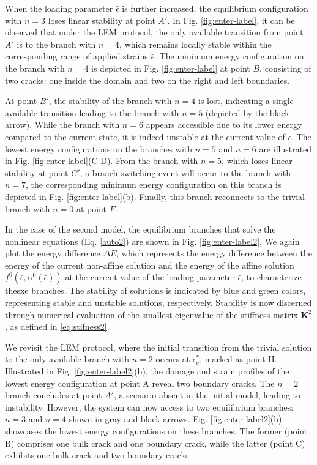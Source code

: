 When the loading parameter $\bar{\epsilon}$ is further increased, the equilibrium configuration with $n=3$ loses linear stability at point $A'$. In Fig. \ref{fig:enter-label}, it can be observed that under the LEM protocol, the only available transition from point $A'$ is to the branch with $n=4$, which remains locally stable within the corresponding range of applied strains $\bar{\epsilon}$. The minimum energy configuration on the branch with $n=4$ is depicted in Fig. \ref{fig:enter-label} at point $B$, consisting of two cracks: one inside the domain and two on the right and left boundaries.

At point $B'$, the stability of the branch with $n=4$ is lost, indicating a single available transition leading to the branch with $n=5$ (depicted by the black arrow). While the branch with $n=6$ appears accessible due to its lower energy compared to the current state, it is indeed unstable at the current  value of $\bar\epsilon$. The lowest energy configurations on the branches with $n=5$ and $n=6$ are illustrated in Fig. \ref{fig:enter-label}(C-D). From the branch with $n=5$, which loses linear stability at point $C'$, a branch switching event will occur to the branch with $n=7$,  the corresponding minimum energy configuration on this branch is depicted in Fig. \ref{fig:enter-label}(b). Finally, this branch reconnects to the trivial branch with $n=0$ at point $F$.

In the case of the second model, the equilibrium branches that solve the nonlinear equations (Eq. \ref{auto2}) are shown in Fig. \ref{fig:enter-label2}. We again plot the energy difference $\Delta E$, which represents the energy difference between the energy of the current non-affine solution and the energy of the affine solution $f^0(\bar{\epsilon}, \alpha^0(\bar{\epsilon}))$ at the current value of the loading parameter $\bar\epsilon$, to characterize thesxe branches. The stability of solutions is indicated by blue and green colors, representing stable and unstable solutions, respectively. Stability is now discerned through numerical evaluation of the smallest eigenvalue of the stiffness matrix $\mathbf{K}^2$, as defined in \eqref{eq:stifness2}.

We revisit the LEM protocol, where the initial transition from the trivial solution to the only available branch with $n=2$ occurs at $\epsilon_c^*$, marked as point H. Illustrated in Fig. \ref{fig:enter-label2}(b), the damage and strain profiles of the lowest energy configuration at point A reveal two boundary cracks. The $n=2$ branch concludes at point $A'$, a scenario absent in the initial model, leading to instability. However, the system can now access to two equilibrium branches: $n=3$ and $n=4$ shown in gray and black arrows. Fig. \ref{fig:enter-label2}(b) showcases the lowest energy configurations on these branches. The former (point B) comprises one bulk crack and one boundary crack, while the latter  (point C) exhibits one bulk crack and two boundary cracks. 

